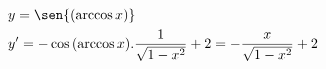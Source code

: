 \begin{ex}
\begin{align}
&y=\sen{(\arccos{x})}\nonumber\\
&y'=-\cos{(\arccos{x})}.\frac{1}{\sqrt{1-x^2}}+2=-\frac{x}{\sqrt{1-x^2}}+2\nonumber
\end{align}
\end{ex}